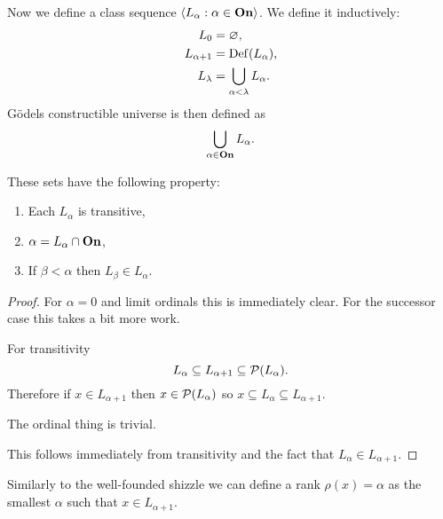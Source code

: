 \begin{definition}
    Now we define a class sequence
    \(\left<L_{\alpha}:\alpha\in{\bf On}\right>\). We define it inductively:
    \begin{align*}
        L_{0}        & =\varnothing,                        \\
        L_{\alpha+1} & =\operatorname{Def}(L_{\alpha}),             \\
        L_{\lambda}  & =\bigcup_{\alpha<\lambda}L_{\alpha}.
    \end{align*}
    Gödels constructible universe is then defined as
    \[
        \bigcup_{\alpha\in{\bf On}}L_{\alpha}.
    \]
\end{definition}

\begin{proposition}
    These sets have the following property:
    \begin{enumerate}
        \item Each \(L_{\alpha}\) is transitive,
        \item \(\alpha=L_{\alpha}\cap{\bf On}\),
        \item If \(\beta<\alpha\) then \(L_{\beta}\in L_{\alpha}\).
    \end{enumerate}

    \begin{proof}
        For \(\alpha=0\) and limit ordinals this is immediately clear. For the
        successor case this takes a bit more work.

        For transitivity
        \[
            L_{\alpha}\subseteq L_{\alpha+1}\subseteq\mathcal{P}(L_{\alpha}).
        \]
        Therefore if \(x\in L_{\alpha+1}\) then \(x\in\mathcal{P}(L_{\alpha})\) so
        \(x\subseteq L_{\alpha}\subseteq L_{\alpha+1}\).

        The ordinal thing is trivial.

        This follows immediately from transitivity and the fact that
        \(L_{\alpha}\in L_{\alpha+1}\).
    \end{proof}
\end{proposition}

\begin{definition}
    Similarly to the well-founded shizzle we can define a rank
    \(\rho(x)=\alpha\) as the smallest \(\alpha\) such that \(x\in
    L_{\alpha+1}\).
\end{definition}

